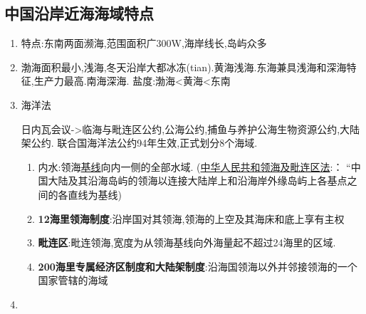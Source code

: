 	
	\subsection{中国沿岸近海海域特点}
		\begin{enumerate}[1)]
			\item 特点:东南两面濒海,范围面积广300W,海岸线长,岛屿众多
			\item 渤海面积最小,浅海,冬天沿岸大都冰冻(tian).黄海浅海.东海兼具浅海和深海特征,生产力最高.南海深海.
					盐度:渤海<黄海<东南
			\item 海洋法
			
			日内瓦会议->临海与毗连区公约,公海公约,捕鱼与养护公海生物资源公约,大陆架公约.
			联合国海洋法公约94年生效,正式划分8个海域.
				\begin{enumerate}
					\item 内水:领海\underline{基线}向内一侧的全部水域.
					(\underline{中华人民共和领海及毗连区法}:： “中国大陆及其沿海岛屿的领海以连接大陆岸上和沿海岸外缘岛屿上各基点之间的各直线为基线)
					\item \textbf{12海里领海制度}:沿岸国对其领海,领海的上空及其海床和底上享有主权
					\item \textbf{毗连区}:毗连领海,宽度为从领海基线向外海量起不超过24海里的区域.
					\item \textbf{200海里专属经济区制度和大陆架制度}:沿海国领海以外并邻接领海的一个国家管辖的海域
				\end{enumerate}
			\item 
			
		\end{enumerate}
